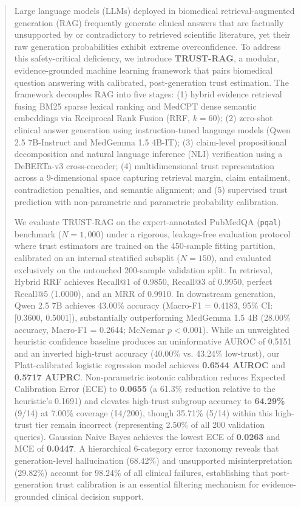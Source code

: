\documentclass[journal,10pt]{IEEEtran}
\begin{document}
\begin{abstract}
Large language models (LLMs) deployed in biomedical retrieval-augmented generation (RAG) frequently generate clinical answers that are factually unsupported by or contradictory to retrieved scientific literature, yet their raw generation probabilities exhibit extreme overconfidence. To address this safety-critical deficiency, we introduce \textbf{TRUST-RAG}, a modular, evidence-grounded machine learning framework that pairs biomedical question answering with calibrated, post-generation trust estimation. The framework decouples RAG into five stages: (1) hybrid evidence retrieval fusing BM25 sparse lexical ranking and MedCPT dense semantic embeddings via Reciprocal Rank Fusion (RRF, $k=60$); (2) zero-shot clinical answer generation using instruction-tuned language models (Qwen 2.5 7B-Instruct and MedGemma 1.5 4B-IT); (3) claim-level propositional decomposition and natural language inference (NLI) verification using a DeBERTa-v3 cross-encoder; (4) multidimensional trust representation across a 9-dimensional space capturing retrieval margin, claim entailment, contradiction penalties, and semantic alignment; and (5) supervised trust prediction with non-parametric and parametric probability calibration.

We evaluate TRUST-RAG on the expert-annotated PubMedQA (\texttt{pqal}) benchmark ($N=1,000$) under a rigorous, leakage-free evaluation protocol where trust estimators are trained on the 450-sample fitting partition, calibrated on an internal stratified subsplit ($N=150$), and evaluated exclusively on the untouched 200-sample validation split. In retrieval, Hybrid RRF achieves Recall@1 of 0.9850, Recall@3 of 0.9950, perfect Recall@5 (1.0000), and an MRR of 0.9910. In downstream generation, Qwen 2.5 7B achieves 43.00\% accuracy (Macro-F1 = 0.4183, 95\% CI: [0.3600, 0.5001]), substantially outperforming MedGemma 1.5 4B (28.00\% accuracy, Macro-F1 = 0.2644; McNemar $p < 0.001$). While an unweighted heuristic confidence baseline produces an uninformative AUROC of 0.5151 and an inverted high-trust accuracy (40.00\% vs. 43.24\% low-trust), our Platt-calibrated logistic regression model achieves \textbf{0.6544 AUROC} and \textbf{0.5717 AUPRC}. Non-parametric isotonic calibration reduces Expected Calibration Error (ECE) to \textbf{0.0655} (a 61.3\% reduction relative to the heuristic's 0.1691) and elevates high-trust subgroup accuracy to \textbf{64.29\%} (9/14) at 7.00\% coverage (14/200), though 35.71\% (5/14) within this high-trust tier remain incorrect (representing 2.50\% of all 200 validation queries). Gaussian Naive Bayes achieves the lowest ECE of \textbf{0.0263} and MCE of \textbf{0.0447}. A hierarchical 6-category error taxonomy reveals that generation-level hallucination (68.42\%) and unsupported misinterpretation (29.82\%) account for 98.24\% of all clinical failures, establishing that post-generation trust calibration is an essential filtering mechanism for evidence-grounded clinical decision support.
\end{abstract}
\end{document}

